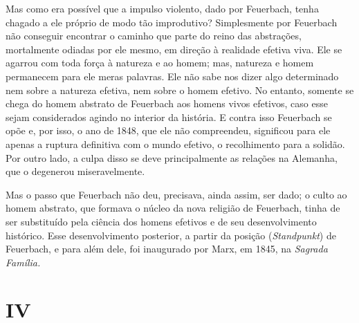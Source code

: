 Mas como era possível que a impulso violento, dado
por Feuerbach, tenha
chagado a ele próprio de modo tão improdutivo? Simplesmente por
Feuerbach não
conseguir encontrar o caminho que parte do reino das abstrações,
mortalmente odiadas por ele mesmo, em direção à realidade efetiva viva.
Ele se agarrou com toda força à natureza e ao homem; mas, natureza e
homem permanecem para ele meras palavras. Ele não sabe nos dizer algo
determinado nem sobre a natureza efetiva, nem sobre o homem efetivo. No
entanto, somente se chega do homem abstrato
de Feuerbach aos
homens vivos efetivos, caso esse sejam considerados agindo no interior
da história. E contra isso
Feuerbach se
opõe e, por isso, o ano de 1848, que ele não compreendeu, significou
para ele apenas a ruptura definitiva com o mundo efetivo, o recolhimento
para a solidão. Por outro lado, a culpa disso se deve principalmente as
relações na Alemanha, que o degenerou miseravelmente.

Mas o passo
que Feuerbach não
deu, precisava, ainda assim, ser dado; o culto ao homem abstrato, que
formava o núcleo da nova religião
de Feuerbach,
tinha de ser substituído pela ciência dos homens efetivos e de seu
desenvolvimento histórico. Esse desenvolvimento posterior, a partir da
posição (\emph{Standpunkt})
de Feuerbach,
e para além dele, foi inaugurado por Marx, em 1845, na \emph{Sagrada
Família.}

\quebra

\mbox{}
\vspace{2cm}

\section{IV}

